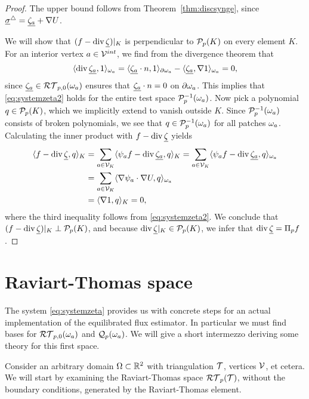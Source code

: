 \documentclass[thesis.tex]{subfiles}
\begin{document}
\begin{proof}
  The upper bound follows from Theorem~\ref{thm:discsynge}, since  $\vsig^\triangle = \vzeta + \nabla U$.

  We will show that $(f - \div \vzet)|_K$ is  perpendicular to $\P_p(K)$ on every element $K$.
  For an interior vertex $a \in \V^{int}$, we find from the divergence theorem that 
  \[
    \ip{\div \vzeta, 1}_{\w_a} =  \ip{\vzeta \cdot n, 1}_{\partial \w_a} - \ip{\vzeta, \nabla 1}_{\w_a} = 0,
  \]
  since $\vzeta \in \RT_{p,0}(\w_a)$ ensures that $\vzeta \cdot n = 0$ on $\partial \w_a$.
  This implies that \eqref{eq:systemzeta2} holds for the entire test space $\P_p^{-1}(\w_a)$. Now pick a polynomial $q \in \P_p(K)$,
  which we implicitly extend to vanish outside $K$.  Since $\P_p^{-1}(\w_a)$ consists of broken polynomials, we see that $q \in \P_p^{-1}(\w_a)$
  for all patches $\w_a$. Calculating the inner product with $f - \div \vzet$ yields
  \begin{align*}
    \ip{f - \div \vzet, q}_K &= \sum_{a \in \V_K} \ip{ \psi_a f - \div \vzeta, q}_{K} = \sum_{a \in \V_K} \ip {\psi_a f - \div \vzeta, q}_{\w_a}\\
     &=\sum_{a \in \V_K} \ip{\nabla \psi_a \cdot \nabla U, q}_{\w_a}\\
    &= \ip{\nabla 1, q}_{K} = 0,
  \end{align*}
  where the third inequality follows from \eqref{eq:systemzeta2}. We conclude that  $(f - \div \vzet)|_K \perp \P_p(K)$, and because $\div \vzet|_K \in \P_p(K)$,
  we infer that $\div \vzet= \Pi_p f$.
\end{proof}


\section{Raviart-Thomas space}
The system \eqref{eq:systemzeta} provides us with concrete steps for an actual implementation of the equilibrated flux
estimator. In particular we must find bases for $\RT_{p,0}(\w_a)$ and $\QQ_p(\w_a)$. We will give a short
intermezzo deriving some theory for this first space. 

Consider an arbitrary domain $ \O \subset \R^2$ with triangulation $ \T$, vertices $ \V$, et cetera.
We will start by examining the Raviart-Thomas space $\RT_p( \T)$, without the boundary conditions,
generated by the Raviart-Thomas element.
\end{document}
